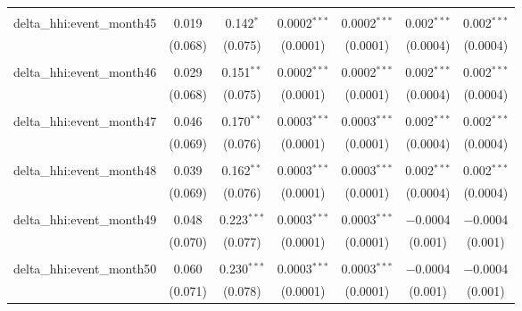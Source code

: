 \begin{table}[H]
{\begin{tabular}{@{\extracolsep{5pt}}lcccccc}
   & & & & & & \\  

  delta\_hhi:event\_month45 & 0.019 & 0.142$^{*}$ & 0.0002$^{***}$ & 0.0002$^{***}$ & 0.002$^{***}$ & 0.002$^{***}$ \\  

   & (0.068) & (0.075) & (0.0001) & (0.0001) & (0.0004) & (0.0004) \\  

   & & & & & & \\  

  delta\_hhi:event\_month46 & 0.029 & 0.151$^{**}$ & 0.0002$^{***}$ & 0.0002$^{***}$ & 0.002$^{***}$ & 0.002$^{***}$ \\  

   & (0.068) & (0.075) & (0.0001) & (0.0001) & (0.0004) & (0.0004) \\  

   & & & & & & \\  

  delta\_hhi:event\_month47 & 0.046 & 0.170$^{**}$ & 0.0003$^{***}$ & 0.0003$^{***}$ & 0.002$^{***}$ & 0.002$^{***}$ \\  

   & (0.069) & (0.076) & (0.0001) & (0.0001) & (0.0004) & (0.0004) \\  

   & & & & & & \\  

  delta\_hhi:event\_month48 & 0.039 & 0.162$^{**}$ & 0.0003$^{***}$ & 0.0003$^{***}$ & 0.002$^{***}$ & 0.002$^{***}$ \\  

   & (0.069) & (0.076) & (0.0001) & (0.0001) & (0.0004) & (0.0004) \\  

   & & & & & & \\  

  delta\_hhi:event\_month49 & 0.048 & 0.223$^{***}$ & 0.0003$^{***}$ & 0.0003$^{***}$ & $-$0.0004 & $-$0.0004 \\  

   & (0.070) & (0.077) & (0.0001) & (0.0001) & (0.001) & (0.001) \\  

   & & & & & & \\  

  delta\_hhi:event\_month50 & 0.060 & 0.230$^{***}$ & 0.0003$^{***}$ & 0.0003$^{***}$ & $-$0.0004 & $-$0.0004 \\  

   & (0.071) & (0.078) & (0.0001) & (0.0001) & (0.001) & (0.001) \\  


\end{tabular}}
\end{table}
